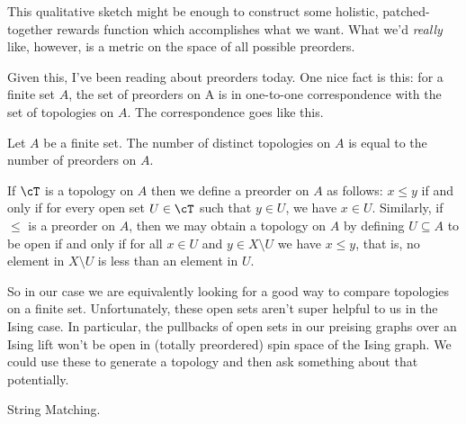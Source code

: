 This qualitative sketch might be enough to construct some holistic, patched-together rewards function which accomplishes what we want. What we'd \emph{really} like, however, is a metric on the space of all possible preorders.

Given this, I've been reading about preorders today. One nice fact is this: for a finite set $A$, the set of preorders on A is in one-to-one correspondence with the set of topologies on $A$. The correspondence goes like this.

\begin{prop}\label{prop}
	Let $A$ be a finite set. The number of distinct topologies on $A$ is equal to the number of preorders on $A$.
\end{prop}
\begin{prf}
	If $\cT$ is a topology on $A$ then we define a preorder on $A$ as follows: $x \leq y$ if and only if for every open set $U \in \cT$ such that $y \in U$, we have $x \in U$. Similarly, if $\leq$ is a preorder on $A$, then we may obtain a topology on $A$ by defining $U \subseteq A$ to be open if and only if for all $x \in U$ and $y\in X\setminus U$ we have $x \leq y$, that is, no element in $X \setminus U$ is less than an element in $U$.
\end{prf}

So in our case we are equivalently looking for a good way to compare topologies on a finite set. Unfortunately, these open sets aren't super helpful to us in the Ising case. In particular, the pullbacks of open sets in our preising graphs over an Ising lift won't be open in (totally preordered) spin space of the Ising graph. We could use these to generate a topology and then ask something about that potentially.

String Matching.

